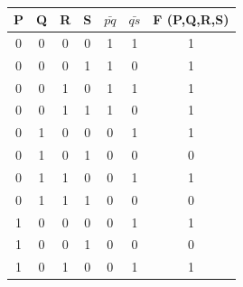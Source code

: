 \documentclass[conference]{IEEEtran}
\begin{document}
\begin{table} [htbp]
\centering
\begin{tabular}{| c | c | c | c | c | c | c |} \hline
P & Q & R & S & $\bar{pq}$ & $\bar{qs}$ & F (P,Q,R,S)    \\\hline
0 & 0 & 0 & 0 & 1 & 1 & 1 \\ \hline
0 & 0 & 0 & 1 & 1 & 0 & 1 \\ \hline
0 & 0 & 1 & 0 & 1 & 1 & 1 \\ \hline
0 & 0 & 1 & 1 & 1 & 0 & 1 \\ \hline
0 & 1 & 0 & 0 & 0 & 1 & 1 \\ \hline
0 & 1 & 0 & 1 & 0 & 0 & 0 \\ \hline
0 & 1 & 1 & 0 & 0 & 1 & 1 \\ \hline
0 & 1 & 1 & 1 & 0 & 0 & 0 \\ \hline
1 & 0 & 0 & 0 & 0 & 1 & 1 \\ \hline
1 & 0 & 0 & 1 & 0 & 0 & 0 \\ \hline
1 & 0 & 1 & 0 & 0 & 1 & 1 \\ \hline
\end{tabular}
\vspace{0.2cm}
\caption{\label{tab:widgets}}
\end{table}
\end{document}

